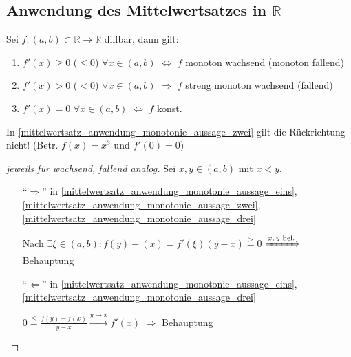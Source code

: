 \subsection{Anwendung des Mittelwertsatzes in \texorpdfstring{$\mathbb{R}$}{R}}
\begin{proposition}[Monotonie]
	Sei $f:(a,b)\subset\mathbb{R}\to \mathbb{R}$ \gls{diffbar}, dann gilt:
	\begin{enumerate}[label={\roman*)}]
		\item {}$f'(x) \ge 0$ ($\le 0$) $\forall x\in (a,b)$ $\Leftrightarrow$ $f$ monoton wachsend (monoton fallend)
		\item {} 	$f'(x) > 0$ ($< 0$) $\forall x\in (a,b)$ $\Rightarrow$ $f$ streng monoton wachsend (fallend)
		\item {} $f'(x) = 0$ $\forall x\in (a,b)$ $\Leftrightarrow$ $f$ konst.
	\end{enumerate}
\end{proposition}

\begin{remark}
	In \ref{mittelwertsatz_anwendung_monotonie_aussage_zwei} gilt die Rückrichtung nicht! (Betr. $f(x) = x^3$ und $f'(0) = 0$)
\end{remark}

\begin{proof}[jeweils für wachsend, fallend analog]
	Sei $x,y\in (a,b)$ mit $x < y$.
	\begin{itemize}[topsep=\dimexpr -\baselineskip / 2 \relax]
		\item["`$\Rightarrow$"'] in \ref{mittelwertsatz_anwendung_monotonie_aussage_eins}, \ref{mittelwertsatz_anwendung_monotonie_aussage_zwei}, \ref{mittelwertsatz_anwendung_monotonie_aussage_drei}
		
		Nach  $\exists \xi\in(a,b): f(y) - (x) = f'(\xi) (y - x) \stackrel{>}{=} 0$ $\xRightarrow{\text{$x,y$ bel.}}$ Behauptung
		
		\item["`$\Leftarrow$"'] in \ref{mittelwertsatz_anwendung_monotonie_aussage_eins}, \ref{mittelwertsatz_anwendung_monotonie_aussage_drei}
		
		$0 \stackrel{\le}{=} \frac{f(y) - f(x)}{y - x} \xrightarrow{y\to x} f'(x)$ $\Rightarrow$ Behauptung
	\end{itemize}
\end{proof}

